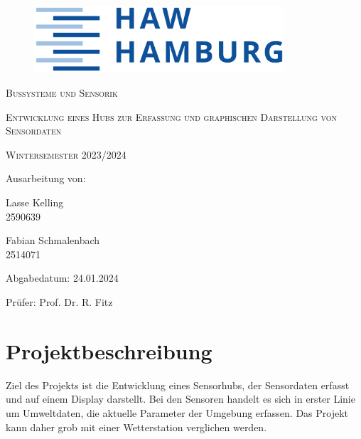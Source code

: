 \documentclass[a4paper,11pt]{article}
\begin{document}
\begin{titlepage}

  \begin{figure}
    \centering
    \includegraphics[height=2.5cm]{HAWLogo}
  \end{figure}

  \vspace*{2cm}
  \centering
  {\scshape\Large Bussysteme und Sensorik \par}
  \vspace{1cm}
  {\scshape\LARGE Entwicklung eines Hubs zur Erfassung und graphischen Darstellung von Sensordaten \par}
  \vspace{0.5cm}
  {\scshape\large Wintersemester 2023/2024 \par}
  \vspace{5cm}

  \raggedright
  Ausarbeitung von:

  \vspace{0.5cm}
  Lasse Kelling \\
  2590639

  \vspace{0.2cm}
  Fabian Schmalenbach \\
  2514071

  \vspace{0.5cm}
  Abgabedatum: 24.01.2024

  \vspace{0.5cm}
  Prüfer: Prof. Dr. R. Fitz



\end{titlepage}

\newpage
{}
\tableofcontents
\thispagestyle{empty}
\newpage

\setcounter{page}{1}    %

\section{Projektbeschreibung}
\label{sub:projektbeschreibung}

Ziel des Projekts ist die Entwicklung eines Sensorhubs, der Sensordaten erfasst und auf einem Display darstellt.
Bei den Sensoren handelt es sich in erster Linie um Umweltdaten, die aktuelle Parameter der Umgebung erfassen.
Das Projekt kann daher grob mit einer Wetterstation verglichen werden.
\end{document}
